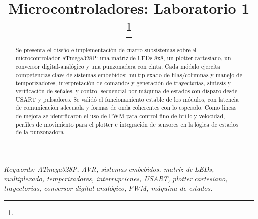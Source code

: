 \documentclass[conference]{IEEEtran}
\begin{document}
\title{Microcontroladores: Laboratorio 1\\
{\footnotesize \textsuperscript{}
}
\thanks{}
}

\author{
\and
{}
\and
{}
}
\maketitle


\begin{abstract}
Se presenta el diseño e implementación de cuatro subsistemas sobre el microcontrolador ATmega328P: una matriz de LEDs 8x8, un plotter cartesiano, un conversor digital-analógico y una punzonadora con cinta. Cada módulo ejercita competencias clave de sistemas embebidos: multiplexado de filas/columnas y manejo de temporizadores, interpretación de comandos y generación de trayectorias, síntesis y verificación de señales, y control secuencial por máquina de estados con disparo desde USART y pulsadores. 
Se validó el funcionamiento estable de los módulos, con latencia de comunicación adecuada y formas de onda coherentes con lo esperado. Como líneas de mejora se identificaron el uso de PWM para control fino de brillo y velocidad, perfiles de movimiento para el plotter e integración de sensores en la lógica de estados de la punzonadora.
\end{abstract}

\textit{Keywords: ATmega328P, AVR, sistemas embebidos, matriz de LEDs, multiplexado, temporizadores, interrupciones, USART, plotter cartesiano, trayectorias, conversor digital-analógico, PWM, máquina de estados.}










            

\nocite{*}



\end{document}
